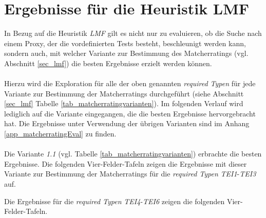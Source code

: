 \section{Ergebnisse für die Heuristik LMF}\label{sec_evalLMF}
In Bezug auf die Heuristik \emph{LMF} gilt es nicht nur zu evaluieren, ob die Suche nach einem Proxy, der die vordefinierten Tests besteht, beschleunigt werden kann, sondern auch, mit welcher Variante zur Bestimmung des Matcherratings (vgl. Abschnitt \ref{sec_lmf}) die besten Ergebnisse erzielt werden können. 
\\\\
Hierzu wird die Exploration für alle der oben genannten \emph{required Typen} für jede Variante zur Bestimmung der Matcherratings durchgeführt (siehe Abschnitt \ref{sec_lmf} Tabelle \ref{tab_matcherratingvarianten}). Im folgenden Verlauf wird lediglich auf die Variante eingegangen, die die besten Ergebnisse hervorgebracht hat. Die Ergebnisse unter Verwendung der übrigen Varianten sind im Anhang \ref{app_matcherratingEval} zu finden.
\\\\
Die Variante \emph{1.1} (vgl. Tabelle \ref{tab_matcherratingvarianten}) erbrachte die besten Ergebnisse. Die folgenden Vier-Felder-Tafeln zeigen die Ergebnisse mit dieser Variante zur Bestimmung der Matcherratings für die \emph{required Typen} \emph{TEI1}-\emph{TEI3} auf.
\begin{multicols}{3}
\columnbreak
{}\columnbreak
{}
\end{multicols}
\noindent
Die Ergebnisse für die \emph{required Typen} \emph{TEI4}-\emph{TEI6} zeigen die folgenden Vier-Felder-Tafeln. 
\begin{multicols}{3}
\columnbreak
{}\columnbreak
{}
\end{multicols}
